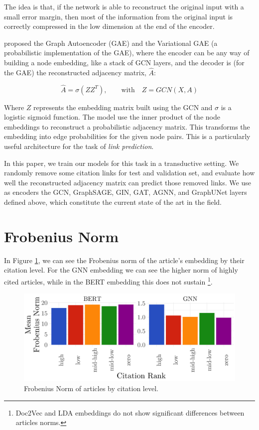 \documentclass[smallextended]{svjour3}
\begin{document}
\begin{appendices}
		The idea is that, if the network is able to reconstruct the original input with a small error margin, then most of the information from the original input is correctly compressed in the low dimension at the end of the encoder.
		
		\cite{kipf_variational_2016} proposed the Graph Autoencoder (GAE) and the Variational GAE (a probabilistic implementation of the GAE), where the encoder can be any way of building a node embedding, like a stack of GCN layers, and the decoder is (for the GAE) the reconstructed adjacency matrix, $\hat{A}$:
		
		\begin{equation*}\label{GAE}
		\hat{A} = \sigma(ZZ^T), \qquad \text{with} \quad Z = GCN(X,A)
		\end{equation*}
		
		Where $Z$ represents the embedding matrix built using the GCN and $\sigma$ is a logistic sigmoid function. The model use the inner product of the node embeddings to reconstruct a probabilistic adjacency matrix. This transforms the embedding into edge probabilities for the given node pairs. This is a particularly useful architecture for the task of \textit{link prediction}.
		
		In this paper, we train our models for this task in a transductive setting. We randomly remove some citation links for test and validation set, and evaluate how well the reconstructed adjacency matrix can predict those removed links. We use as encoders the GCN, GraphSAGE, GIN, GAT, AGNN, and GraphUNet layers defined above, which constitute the current state of the art in the field.
		
		\section{Frobenius Norm}\label{sec:frobenius_norm}
		\setcounter{table}{0}
		\setcounter{figure}{0}    
		
		In Figure \ref{fig:frobeniousnorm}, we can see the Frobenius norm of the article's embedding by their citation level. For the GNN embedding we can see the higher norm of highly cited articles, while in the BERT embedding this does not sustain \footnote{Doc2Vec and LDA embeddings do not show significant differences between articles norms.}.
		
		\begin{figure}[htbp]
			\centering
			\includegraphics[width=\linewidth]{FigD1}
			\caption{Frobenius Norm of articles by citation level.}
			\label{fig:frobeniousnorm}
		\end{figure}
		
		
	\end{appendices}
	
\end{document}

